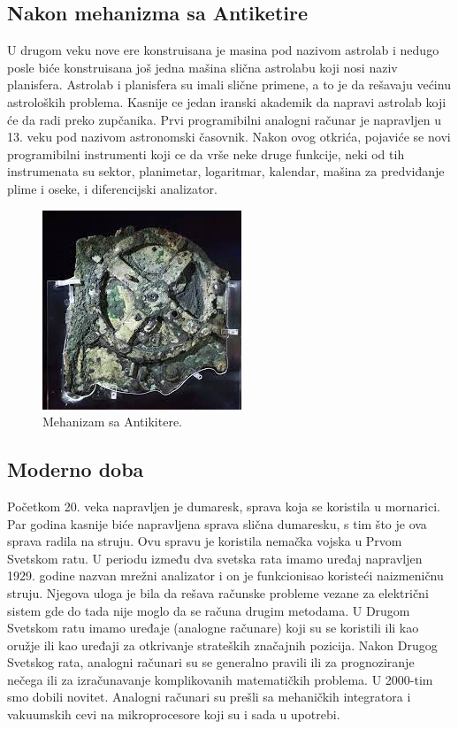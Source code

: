 \documentclass[a4paper]{article}
\begin{document}
\subsection{Nakon mehanizma sa Antiketire}
\label{subsec:podnaslovK}

U drugom veku nove ere konstruisana je masina pod nazivom astrolab i nedugo posle biće konstruisana još jedna mašina slična astrolabu koji nosi naziv planisfera. Astrolab i planisfera su imali slične primene, a to je da rešavaju većinu astroloških problema. Kasnije ce jedan iranski akademik da napravi astrolab koji će da radi preko zupčanika. Prvi programibilni analogni računar je napravljen u 13. veku pod nazivom astronomski časovnik. Nakon ovog otkrića, pojaviće se novi programibilni instrumenti koji ce da vrše neke druge funkcije, neki od tih instrumenata su sektor, planimetar, logaritmar, kalendar, mašina za predviđanje plime i oseke, i diferencijski analizator. 

\begin{figure}[h!]
\begin{center}
\includegraphics[scale=0.7]{MehanizamSaAntiketere.jpg}
\end{center}
\caption{Mehanizam sa Antikitere. }
\label{fig:h2}
\end{figure}

\pagebreak

\subsection{Moderno doba}
\label{subsec:podnaslovM}

Početkom 20. veka napravljen je dumaresk, sprava koja se koristila u mornarici. Par godina kasnije biće napravljena sprava slična dumaresku, s tim što je ova sprava radila na struju. Ovu spravu je koristila nemačka vojska u Prvom Svetskom ratu. U periodu između dva svetska rata imamo uređaj napravljen 1929. godine nazvan mrežni analizator i on je funkcionisao koristeći naizmeničnu struju. Njegova uloga je bila da rešava računske probleme vezane za električni sistem gde do tada nije moglo da se računa drugim metodama. U Drugom Svetskom ratu imamo uređaje (analogne računare) koji su se koristili ili kao oružje ili kao uređaji za otkrivanje strateških značajnih pozicija. Nakon Drugog Svetskog rata, analogni računari su se generalno pravili ili za prognoziranje nečega ili za izračunavanje komplikovanih matematičkih problema. U 2000-tim smo dobili novitet. Analogni računari su prešli sa mehaničkih integratora i vakuumskih cevi na mikroprocesore koji su i sada u upotrebi.
\end{document}
